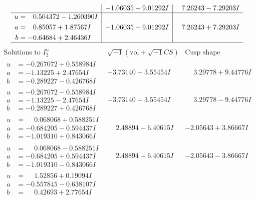 \documentclass[1p]{elsarticle_modified}
\theoremstyle{definition}
\newcommand{\I}{\sqrt{-1}}
\begin{document}
$$\begin{array}{c|c|c}
 & -1.06035 + 9.01292 I & \phantom{-}7.26243 - 7.29203 I \\ \hline\begin{aligned}
u &= \phantom{-}0.504372 - 1.260390 I \\
a &= \phantom{-}0.85057 + 1.87567 I \\
b &= -0.64684 + 2.46436 I\end{aligned}
 & -1.06035 - 9.01292 I & \phantom{-}7.26243 + 7.29203 I\\
 \hline 
 \end{array}$$\newpage$$\begin{array}{c|c|c}  
\text{Solutions to }I^u_{2}& \I (\text{vol} + \sqrt{-1}CS) & \text{Cusp shape}\\
 \hline 
\begin{aligned}
u &= -0.267072 + 0.558984 I \\
a &= -1.13225 + 2.47654 I \\
b &= -0.289227 - 0.426768 I\end{aligned}
 & -3.73140 - 3.55454 I & \phantom{-}3.29778 + 9.44776 I \\ \hline\begin{aligned}
u &= -0.267072 - 0.558984 I \\
a &= -1.13225 - 2.47654 I \\
b &= -0.289227 + 0.426768 I\end{aligned}
 & -3.73140 + 3.55454 I & \phantom{-}3.29778 - 9.44776 I \\ \hline\begin{aligned}
u &= \phantom{-}0.068068 + 0.588251 I \\
a &= -0.684205 - 0.594437 I \\
b &= -1.019310 + 0.843066 I\end{aligned}
 & \phantom{-}2.48894 - 6.40615 I & -2.05643 + 3.86667 I \\ \hline\begin{aligned}
u &= \phantom{-}0.068068 - 0.588251 I \\
a &= -0.684205 + 0.594437 I \\
b &= -1.019310 - 0.843066 I\end{aligned}
 & \phantom{-}2.48894 + 6.40615 I & -2.05643 - 3.86667 I \\ \hline\begin{aligned}
u &= \phantom{-}1.52856 + 0.19094 I \\
a &= -0.557845 - 0.638107 I \\
b &= \phantom{-}0.42693 + 2.77654 I\end{aligned}

\end{array}$$
\end{document}
